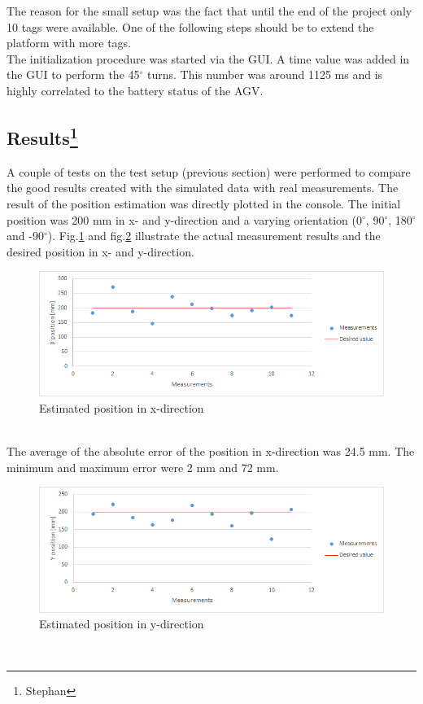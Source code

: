 The reason for the small setup was the fact that until the end of the project only 10 tags were available. One of the following steps should be to extend the platform with more tags.\\
The initialization procedure was started via the GUI. A time value was added in the GUI to perform the 45$^\circ$ turns. This number was around 1125 ms and is highly correlated to the battery status of the AGV.\\

\subsection[Results]{Results\footnote{Stephan}}
A couple of tests on the test setup (previous section) were performed to compare the good results created with the simulated data with real measurements. The result of the position estimation was directly plotted in the console. The initial position was 200 mm in x- and y-direction and a varying orientation (0$^\circ$, 90$^\circ$, 180$^\circ$ and -90$^\circ$). Fig.\ref{ResultX} and fig.\ref{ResultY} illustrate the actual measurement results and the desired position in x- and y-direction. 
\begin{figure}[!htbp]
\centering
\includegraphics[width = 14cm]{Pictures/ResultX}
\caption{Estimated position in x-direction}
\label{ResultX}
\end{figure}\\
The average of the absolute error of the position in x-direction was 24.5 mm. The minimum and maximum error were 2 mm and 72 mm.\\
\begin{figure}[!htbp]
\centering
\includegraphics[width = 14cm]{Pictures/ResultY}
\caption{Estimated position in y-direction}
\label{ResultY}
\end{figure}\\
